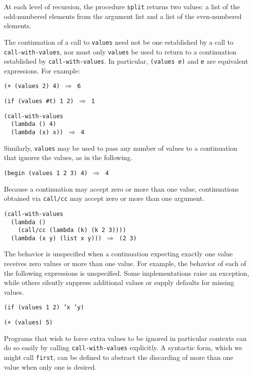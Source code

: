 At each level of recursion, the procedure \label{control_s76}\texttt{split} returns two
values:  a list of the odd-numbered elements from the argument list and
a list of the even-numbered elements.



The continuation of a call to \texttt{values} need not be one established
by a call to \texttt{call-with-values}, nor must only \texttt{values} be used to return
to a continuation established by \texttt{call-with-values}.
In particular, \texttt{(values \textit{e})} and \texttt{\textit{e}} are equivalent expressions.
For example:


\begin{alltt}
(+ (values 2) 4) \(\Rightarrow\) 6

(if (values \#{}t) 1 2) \(\Rightarrow\) 1

(call-with-values
  (lambda () 4)
  (lambda (x) x)) \(\Rightarrow\) 4
\end{alltt}


Similarly, \texttt{values} may be used to pass any number of values to
a continuation that ignores the values, as in the following.


\texttt{(begin (values 1 2 3) 4) \(\Rightarrow\) 4}

Because a continuation may accept zero or more than one value,
continuations obtained via
\label{control_s77}\texttt{call/cc} may
accept zero or more than one argument.


\begin{alltt}
(call-with-values
  (lambda ()
    (call/cc (lambda (k) (k 2 3))))
  (lambda (x y) (list x y))) \(\Rightarrow\) (2 3)
\end{alltt}


The behavior is unspecified when a
continuation expecting exactly one value receives zero values or more
than one value.
For example, the behavior of each of the following expressions is
unspecified.
Some implementations raise an exception, while others silently
suppress additional values or supply defaults for missing values.


\begin{alltt}
(if (values 1 2) 'x 'y)

(+ (values) 5)
\end{alltt}


Programs that wish to force extra values to be ignored in particular
contexts can do so easily by calling \texttt{call-with-values} explicitly.
A syntactic form, which we might call \texttt{first}, can be defined to
abstract the discarding of more than one value when only one is
desired.


